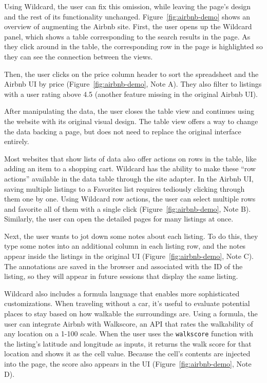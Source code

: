 \documentclass[english,submission]{programming}
\begin{document}
Using Wildcard, the user can fix this omission, while leaving the page's
design and the rest of its functionality unchanged.{
Figure~\ref{fig:airbnb-demo} shows an overview of augmenting the Airbnb
site.} First, the user opens up the Wildcard panel, which shows a table
corresponding to the search results in the page. As they click around in
the table, the corresponding row in the page is highlighted so they can
see the connection between the views.

Then, the user clicks on the price column header to sort the spreadsheet
and the Airbnb UI by price{ (Figure~\ref{fig:airbnb-demo}, Note A)}.
They also filter to listings with a user rating above 4.5 (another
feature missing in the original Airbnb UI).

After manipulating the data, the user closes the table view and
continues using the website with its original visual design. The table
view offers a way to change the data backing a page, but does not need
to replace the original interface entirely.

Most websites that show lists of data also offer actions on rows in the
table, like adding an item to a shopping cart. Wildcard has the ability
to make these ``row actions'' available in the data table through the
site adapter. In the Airbnb UI, saving multiple listings to a Favorites
list requires tediously clicking through them one by one. Using Wildcard
row actions, the user can select multiple rows and favorite all of them
with a single click{ (Figure~\ref{fig:airbnb-demo}, Note B)}. Similarly,
the user can open the detailed pages for many listings at once.

Next, the user wants to jot down some notes about each listing. To do
this, they type some notes into an additional column in each listing
row, and the notes appear inside the listings in the original UI{
(Figure~\ref{fig:airbnb-demo}, Note C)}. The annotations are saved in
the browser and associated with the ID of the listing, so they will
appear in future sessions that display the same listing.

Wildcard also includes a formula language that enables more
sophisticated customizations. When traveling without a car, it's useful
to evaluate potential places to stay based on how walkable the
surroundings are. Using a formula, the user can integrate Airbnb with
Walkscore, an API that rates the walkability of any location on a 1-100
scale. When the user uses the \texttt{walkscore} function with the
listing's latitude and longitude as inputs, it returns the walk score
for that location and shows it as the cell value. Because the cell's
contents are injected into the page, the score also appears in the UI{
(Figure~\ref{fig:airbnb-demo}, Note D)}.
\end{document}
